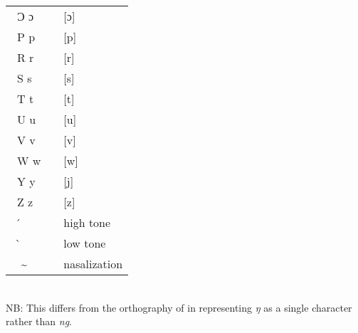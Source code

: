 \begin{refsection}
\begin{tabular}{lcl}
\ Ɔ ɔ&	\hspace{2em}& [ɔ]\\
\ P p&	\hspace{2em}& [p]\\
\ R r &\hspace{2em} &[r]\\
\ S s&	\hspace{2em} &[s]\\
\ T t&	\hspace{2em} &[t]\\
\ U u&	\hspace{2em} &[u]\\
\ V v&	\hspace{2em} &[v]\\
\ W w&	\hspace{2em} &[w]\\
\ Y y&	\hspace{2em} &[j]\\
\ Z z &\hspace{2em} &[z]\\
\ { } ́ &\hspace{2em} &high tone\\
\ { } ̀ &\hspace{2em} &low tone\\
\ { }{ } \~ &\hspace{2em} &nasalization\\ 
\end{tabular}\\


 \noindent NB: This differs from the orthography of \citet{DagaareLanguageCommission1982} in representing \textit{ŋ} as a single character rather than \textit{ng}.






\end{refsection}
